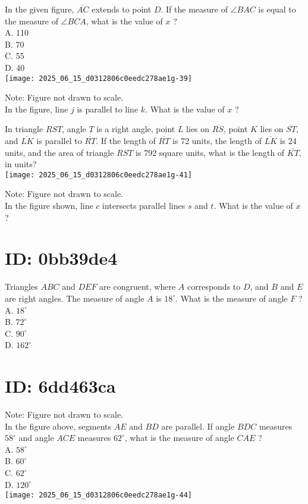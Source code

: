 In the given figure, $\overline{A C}$ extends to point $D$. If the measure of $\angle B A C$ is equal to the measure of $\angle B C A$, what is the value of $x$ ?\\
A. 110\\
B. 70\\
C. 55\\
D. 40\\
\texttt{[image: 2025\_06\_15\_d0312806c0eedc278ae1g-39]}

Note: Figure not drawn to scale.\\
In the figure, line $j$ is parallel to line $k$. What is the value of $x$ ?

In triangle $R S T$, angle $T$ is a right angle, point $L$ lies on $\overline{R S}$, point $K$ lies on $\overline{S T}$, and $\overline{L K}$ is parallel to $\overline{R T}$. If the length of $\overline{R T}$ is 72 units, the length of $\overline{L K}$ is 24 units, and the area of triangle $R S T$ is 792 square units, what is the length of $\overline{K T}$, in units?\\
\texttt{[image: 2025\_06\_15\_d0312806c0eedc278ae1g-41]}

Note: Figure not drawn to scale.\\
In the figure shown, line $c$ intersects parallel lines $s$ and $t$. What is the value of $x$ ?

\section*{ID: 0bb39de4}
Triangles $A B C$ and $D E F$ are congruent, where $A$ corresponds to $D$, and $B$ and $E$ are right angles. The measure of angle $A$ is $18^{\circ}$. What is the measure of angle $F$ ?\\
A. $18^{\circ}$\\
B. $72^{\circ}$\\
C. $90^{\circ}$\\
D. $162^{\circ}$

\section*{ID: 6dd463ca}
Note: Figure not drawn to scale.\\
In the figure above, segments $A E$ and $B D$ are parallel. If angle $B D C$ measures $58^{\circ}$ and angle $A C E$ measures $62^{\circ}$, what is the measure of angle $C A E$ ?\\
A. $58^{\circ}$\\
B. $60^{\circ}$\\
C. $62^{\circ}$\\
D. $120^{\circ}$\\
\texttt{[image: 2025\_06\_15\_d0312806c0eedc278ae1g-44]}


